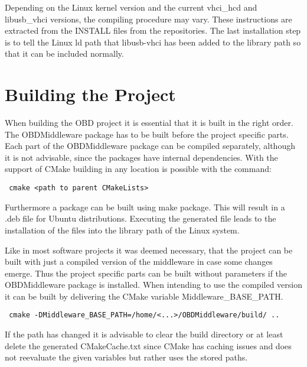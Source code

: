 Depending on the Linux kernel version and the current vhci\_hcd and libusb\_vhci versions, 
the compiling procedure may vary. These instructions are extracted from the INSTALL 
files from the repositories. The last installation step is to tell the Linux ld path that 
libusb-vhci has been added to the library path so that it can be included normally.

\section{Building the Project}

When building the OBD project it is essential that it is built in the right order. 
The OBDMiddleware package has to be built before the project specific parts. 
Each part of the OBDMiddleware package can be compiled separately, although it is not advisable, 
since the packages have internal dependencies. 
With the support of CMake building in any location is possible with the command:

\begin{verbatim}
 cmake <path to parent CMakeLists>
\end{verbatim}

Furthermore a package can be built using make package. This will result in a .deb file for Ubuntu distributions. 
Executing the generated file leads to the installation of the files into the library path of the Linux system. 

Like in most software projects it was deemed necessary, that the project can be built with just a compiled version 
of the middleware in case some changes emerge. Thus the project specific parts can be built without parameters 
if the OBDMiddleware package is installed. When intending to use the compiled version it can be built by delivering 
the CMake variable Middleware\_BASE\_PATH.

\begin{verbatim}
 cmake -DMiddleware_BASE_PATH=/home/<...>/OBDMiddleware/build/ .. 
\end{verbatim}

If the path has changed it is advisable to clear the build directory or at least delete the generated CMakeCache.txt 
since CMake has caching issues and does not reevaluate the given variables but rather uses the stored paths. 



